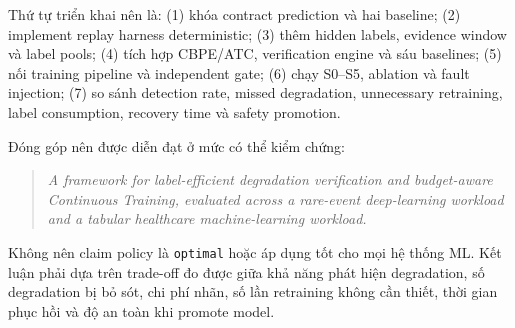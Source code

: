 Thứ tự triển khai nên là: (1) khóa contract prediction và hai baseline; (2) implement replay harness deterministic; (3) thêm hidden labels, evidence window và label pools; (4) tích hợp CBPE/ATC, verification engine và sáu baselines; (5) nối training pipeline và independent gate; (6) chạy S0--S5, ablation và fault injection; (7) so sánh detection rate, missed degradation, unnecessary retraining, label consumption, recovery time và safety promotion.

Đóng góp nên được diễn đạt ở mức có thể kiểm chứng:

\begin{quote}
\textit{A framework for label-efficient degradation verification and budget-aware Continuous Training, evaluated across a rare-event deep-learning workload and a tabular healthcare machine-learning workload.}
\end{quote}

Không nên claim policy là \texttt{optimal} hoặc áp dụng tốt cho mọi hệ thống ML. Kết luận phải dựa trên trade-off đo được giữa khả năng phát hiện degradation, số degradation bị bỏ sót, chi phí nhãn, số lần retraining không cần thiết, thời gian phục hồi và độ an toàn khi promote model.
